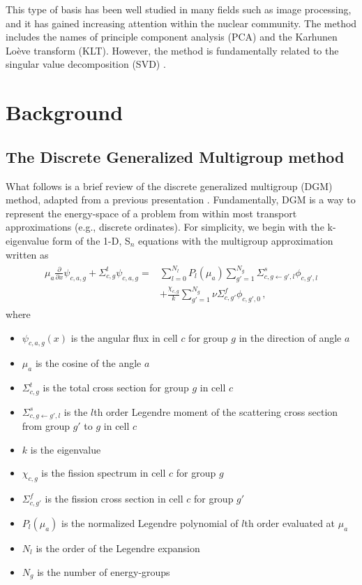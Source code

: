 \documentclass[5p,times,twocolumn,10pt]{elsarticle}
\begin{document}
    This type of basis has been well studied in many fields such as image processing, and it has gained increasing attention within the nuclear community.
    The method includes the names of principle component analysis (PCA) and the Karhunen Lo\`eve transform (KLT).
    However, the method is fundamentally related to the singular value decomposition (SVD) \cite{reed2015energy}.

    \section{Background}
    \subsection{The Discrete Generalized Multigroup method}
    \label{derivation}
    What follows is a brief review of the discrete generalized multigroup (DGM) method, adapted from a previous presentation \cite{gibson_stability_2014}.
    Fundamentally, DGM is a way to represent the energy-space of a problem from within most transport approximations (e.g., discrete ordinates).
    For simplicity, we begin with the k-eigenvalue form of the 1-D, S$_n$ equations with the multigroup approximation written as
    \begin{align}
        \begin{split}
            \mu_a\frac{\partial}{\partial x}\psi_{c,a,g}
            +\Sigma^t_{c,g}\psi_{c,a,g}
            =&\sum_{l=0}^{N_l}P_l(\mu_a)\sum_{g'=1}^{N_g}\Sigma^s_{c,g\leftarrow g',l}\phi_{c,g',l}\\
            &+\frac{\chi_{c,g}}{k}\sum_{g'=1}^{N_g}\nu\Sigma^f_{c,g'}\phi_{c,g',0}\, ,
        \end{split}
        \label{eq:pn}
    \end{align}
    where
    \begin{itemize}\itemsep0em
        \item $\psi_{c,a,g}(x)$ is the angular flux in cell $c$ for group $g$ in the direction of angle $a$
        \item $\mu_a$ is the cosine of the angle $a$
        \item $\Sigma^t_{c,g}$ is the total cross section for group $g$ in cell $c$
        \item $\Sigma^s_{c, g\leftarrow g', l}$ is the $l$th order Legendre moment of the scattering cross section from group $g'$ to $g$ in cell $c$
        \item $k$ is the eigenvalue
        \item $\chi_{c,g}$ is the fission spectrum in cell $c$ for group $g$
        \item $\Sigma^f_{c,g'}$ is the fission cross section in cell $c$ for group $g'$
        \item $P_l(\mu_a)$ is the normalized Legendre polynomial of $l$th order evaluated at $\mu_a$
        \item $N_l$ is the order of the Legendre expansion
        \item $N_g$ is the number of energy-groups
    \end{itemize}
\end{document}

